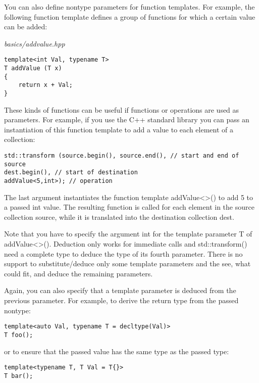 You can also define nontype parameters for function templates. For example, the following function template defines a group of functions for which a certain value can be added:

\noindent
\textit{basics/addvalue.hpp}
\begin{lstlisting}[style=styleCXX]
template<int Val, typename T>
T addValue (T x)
{
	return x + Val;
}
\end{lstlisting}

These kinds of functions can be useful if functions or operations are used as parameters. For example, if you use the C++ standard library you can pass an instantiation of this function template to add a value to each element of a collection:

\begin{lstlisting}[style=styleCXX]
std::transform (source.begin(), source.end(), // start and end of source
dest.begin(), // start of destination
addValue<5,int>); // operation
\end{lstlisting}

The last argument instantiates the function template addValue<>() to add 5 to a passed int value. The resulting function is called for each element in the source collection source, while it is translated into the destination collection dest.

Note that you have to specify the argument int for the template parameter T of addValue<>(). Deduction only works for immediate calls and std::transform() need a complete type to deduce the type of its fourth parameter. There is no support to substitute/deduce only some template parameters and the see, what could fit, and deduce the remaining parameters.

Again, you can also specify that a template parameter is deduced from the previous parameter. For example, to derive the return type from the passed nontype:

\begin{lstlisting}[style=styleCXX]
template<auto Val, typename T = decltype(Val)>
T foo();
\end{lstlisting}

or to ensure that the passed value has the same type as the passed type:

\begin{lstlisting}[style=styleCXX]
template<typename T, T Val = T{}>
T bar();
\end{lstlisting}































